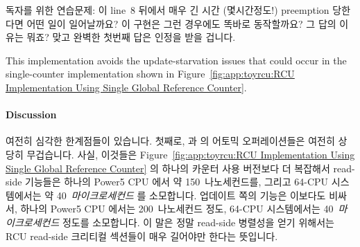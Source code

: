 {	독자를 위한 연습문제:  이 line~8 뒤에서 매우 긴
	시간 (몇시간정도!) preemption 당한다면 어떤 일이 일어날까요?
	이 구현은 그런 경우에도 똑바로 동작할까요?
	그 답의 이유는 뭐죠?
	맞고 완벽한 첫번째 답은 인정을 받을 겁니다.
	\iffalse

	Exercise for the reader: What happens if \co{rcu_read_lock()}
	is preempted for a very long time (hours!) just after
	line~8?
	Does this implementation operate correctly in that case?
	Why or why not?
	The first correct and complete response will be credited.
	\fi
} \QuickQuizEnd
\iffalse

이 구현은
Figure~\ref{fig:app:toyrcu:RCU Implementation Using Single Global Reference Counter}
에서 보인 단일 카운터 구현에서 일어날 수 있는
업데이트 쪽의 starvation 문제를 배제합니다.
\fi

This implementation avoids the update-starvation issues that could
occur in the single-counter implementation shown in
Figure~\ref{fig:app:toyrcu:RCU Implementation Using Single Global Reference Counter}.

\paragraph{Discussion}

여전히 심각한 한계점들이 있습니다.
첫째로,  과  의 어토믹 오퍼레이션들은
여전히 상당히 무겁습니다.
사실, 이것들은
Figure~\ref{fig:app:toyrcu:RCU Implementation Using Single Global Reference Counter}
의 하나의 카운터 사용 버전보다 더 복잡해서 read-side 기능들은 하나의 Power5 CPU
에서 약 150~나노세컨드를, 그리고 64-CPU 시스템에서는 약
40~\emph{마이크로세컨드} 를 소모합니다.
업데이트 쪽의  기능은 이보다도 비싸서, 하나의 Power5 CPU
에서는 200~나노세컨드 정도, 64-CPU 시스템에서는 40~\emph{마이크로세컨드} 정도를
소모합니다.
이 말은 정말 read-side 병렬성을 얻기 위해서는 RCU read-side 크리티컬 섹션들이
매우 길어야만 한다는 뜻입니다.
\iffalse

There are still some serious shortcomings.
First, the atomic operations in \co{rcu_read_lock()}
and \co{rcu_read_unlock()}
are still quite heavyweight.
In fact, they are more complex than those
of the single-counter variant shown in
Figure~\ref{fig:app:toyrcu:RCU Implementation Using Single Global Reference Counter},
with the read-side primitives consuming about 150~nanoseconds on a single
Power5 CPU and almost 40~\emph{microseconds} on a 64-CPU system.
The update-side \co{synchronize_rcu()} primitive is more costly as
well, ranging from about 200~nanoseconds on a single Power5 CPU to
more than 40~\emph{microseconds} on a 64-CPU system.
This means that the RCU read-side critical sections
have to be extremely long in order to get any real
read-side parallelism.
\fi

